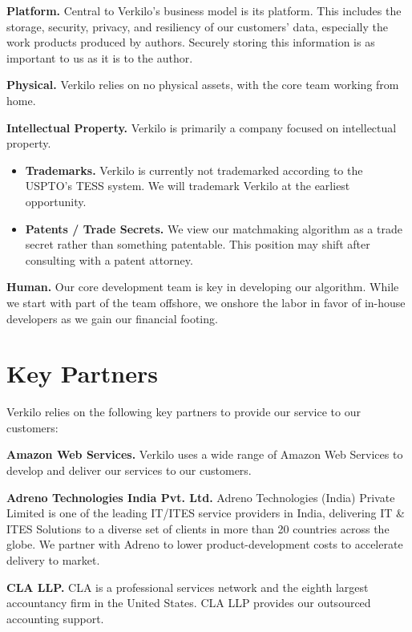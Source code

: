 \documentclass[11pt,openany]{book}
\providecommand{\tightlist}{%
  \setlength{\itemsep}{0pt}\setlength{\parskip}{0pt}}
\begin{document}
\textbf{Platform.} Central to Verkilo's business model is its platform.
This includes the storage, security, privacy, and resiliency of our
customers' data, especially the work products produced by authors.
Securely storing this information is as important to us as it is to the
author.

\textbf{Physical.} Verkilo relies on no physical assets, with the core
team working from home.

\textbf{Intellectual Property.} Verkilo is primarily a company focused
on intellectual property.

\begin{itemize}
\tightlist
\item
  \textbf{Trademarks.} Verkilo is currently not trademarked according to
  the USPTO's TESS system. We will trademark Verkilo at the earliest
  opportunity.
\item
  \textbf{Patents / Trade Secrets.} We view our matchmaking algorithm as
  a trade secret rather than something patentable. This position may
  shift after consulting with a patent attorney.
\end{itemize}

\textbf{Human.} Our core development team is key in developing our
algorithm. While we start with part of the team offshore, we onshore the
labor in favor of in-house developers as we gain our financial footing.

\hypertarget{key-partners}{%
\section{Key Partners}\label{key-partners}}

Verkilo relies on the following key partners to provide our service to
our customers:

\textbf{Amazon Web Services.} Verkilo uses a wide range of Amazon Web
Services to develop and deliver our services to our customers.

\textbf{Adreno Technologies India Pvt. Ltd.} Adreno Technologies (India)
Private Limited is one of the leading IT/ITES service providers in
India, delivering IT \& ITES Solutions to a diverse set of clients in
more than 20 countries across the globe. We partner with Adreno to lower
product-development costs to accelerate delivery to market.

\textbf{CLA LLP.} CLA is a professional services network and the eighth
largest accountancy firm in the United States. CLA LLP provides our
outsourced accounting support.
\end{document}
